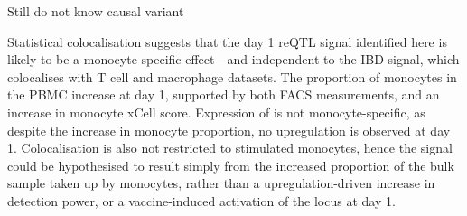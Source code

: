 Still do not know causal variant

Statistical colocalisation suggests that the day 1 reQTL signal identified here is likely to be a monocyte-specific effect---and independent to the IBD signal, which colocalises with T cell and macrophage datasets.
The proportion of monocytes in the PBMC increase at day 1, supported by both FACS\autocite{sobolev2016AdjuvantedInfluenzaH1N1Vaccination} measurements, and an increase in monocyte xCell score.
Expression of  is not monocyte-specific, as despite the increase in monocyte proportion, no upregulation is observed at day 1.
Colocalisation is also not restricted to stimulated monocytes,
hence the signal could be hypothesised to result simply from the increased proportion of the bulk sample taken up by monocytes,
rather than a upregulation-driven increase in detection power,
or a vaccine-induced activation of the locus at day 1.

